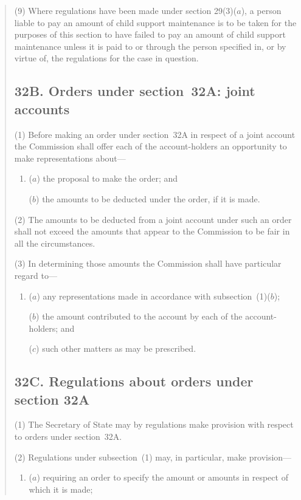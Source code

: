 \documentclass[12pt,a4paper]{article}
\begin{document}
\begin{quotation}
\begin{sloppypar}
(9)
Where regulations have been made under section 29(3)($a$), a person liable to pay an amount of child support maintenance is to be taken for the purposes of this section to have failed to pay an amount of child support maintenance unless it is paid to or through the person specified in, or by virtue of, the regulations for the case in question.
\end{sloppypar}

\subsection*{32B. Orders under section~32A: joint accounts}

(1) Before making an order under section~32A in respect of a joint account 
the Commission shall offer each of the account-holders an opportunity to make representations about---
\begin{enumerate}\item[]
($a$) the proposal to make the order; and

($b$) the amounts to be deducted under the order, if it is made.
\end{enumerate}

(2)
The amounts to be deducted from a joint account under such an order shall not exceed the amounts that appear to the Commission to be fair in all the circumstances.

(3)
In determining those amounts the Commission shall have particular regard to---
\begin{enumerate}\item[]
($a$) any representations made in accordance with subsection~(1)($b$);

\begin{sloppypar}
($b$) the amount contributed to the account by each of the account-holders; and
\end{sloppypar}

($c$) such other matters as may be prescribed.
\end{enumerate}

\subsection*{\sloppy 32C. Regulations about orders under section 32A}

(1) The Secretary of State may by regulations make provision with respect
to orders under section~32A.

(2) Regulations under subsection~(1) may, in particular, make provision---
\begin{enumerate}\item[]
($a$) requiring an order to specify the amount or amounts in respect of which it is made;


\end{enumerate}
\end{quotation}
\end{document}
